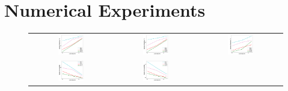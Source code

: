\section{Numerical Experiments}
\label{sec:exp}

\begin{figure}[h!]
\centering
	\begin{tabular}{ccc}
	\hspace{-2em} \includegraphics[width=0.33\textwidth]{fig/paper-stronglycvxsmthspeedupEpochsT-min-w8a-epsilon0131-reg1e-05.pdf} &
	\includegraphics[width=0.33\textwidth]{fig/paper-cvxsmoothspeedupEpochsT-min-w8a-epsilon0134-reg0.pdf} & 
	\includegraphics[width=0.33\textwidth]{fig/paper-linregression-newspeedupEpochsT-min-linearregressionw8a-epsilon002-reg0.pdf} \\
	\hspace{-2em} \includegraphics[width=0.33\textwidth]{fig/paper-stronglycvxsmthspeedupEpochsRounds-min-w8a-epsilon0131-reg1e-05.pdf} &
	\includegraphics[width=0.33\textwidth]{fig/paper-cvxsmoothspeedupEpochsRounds-min-w8a-epsilon0134-reg0.pdf} & 

\end{tabular}
\end{figure}
